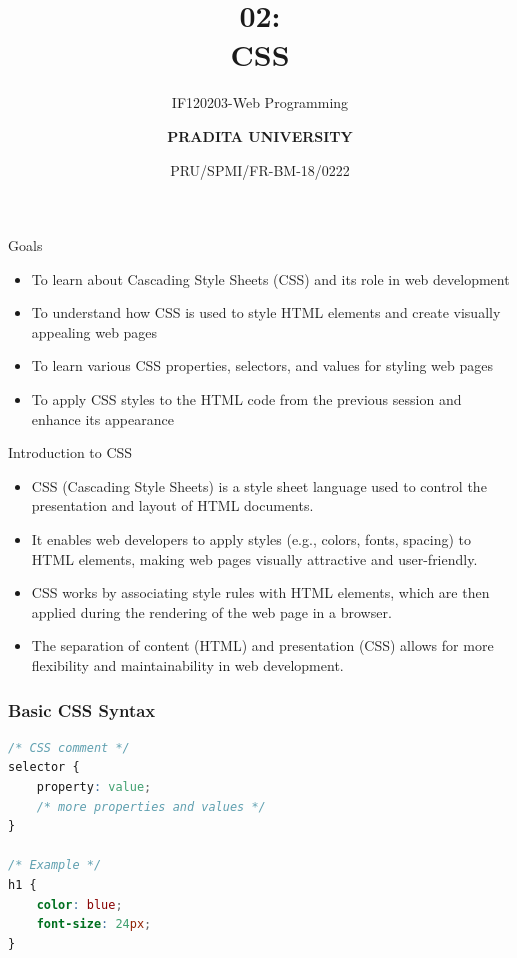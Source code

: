 \documentclass[aspectratio=169, table]{beamer}
\subtitle{IF120203-Web Programming}
\title{\Huge {\textbf{02: \\CSS}}}
\date[Serial]{\scriptsize {PRU/SPMI/FR-BM-18/0222}}
\author[Pradita]{\small {\textbf{PRADITA UNIVERSITY}}}
\begin{document}
\begin{frame}
    \titlepage
\end{frame}

\begin{frame}{Goals}
    \vskip-1cm
    \begin{itemize}
        \item To learn about Cascading Style Sheets (CSS) and its role in web development
        \item To understand how CSS is used to style HTML elements and create visually appealing web pages
        \item To learn various CSS properties, selectors, and values for styling web pages
        \item To apply CSS styles to the HTML code from the previous session and enhance its appearance
    \end{itemize}
\end{frame}

\begin{frame}{Introduction to CSS}
    \vskip-0.5cm
    \begin{itemize}
        \item CSS (Cascading Style Sheets) is a style sheet language used to control the presentation and layout of HTML documents.
        \item It enables web developers to apply styles (e.g., colors, fonts, spacing) to HTML elements, making web pages visually attractive and user-friendly.
        \item CSS works by associating style rules with HTML elements, which are then applied during the rendering of the web page in a browser.
        \item The separation of content (HTML) and presentation (CSS) allows for more flexibility and maintainability in web development.
    \end{itemize}
\end{frame}

\begin{frame}[fragile] %
    \frametitle{Basic CSS Syntax}
    \vskip0.5cm
    \begin{lstlisting}[language=CSS]
/* CSS comment */
selector {
    property: value;
    /* more properties and values */
}

/* Example */
h1 {
    color: blue;
    font-size: 24px;
}
    \end{lstlisting}
\end{frame}
\end{document}

